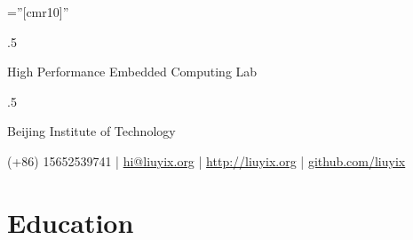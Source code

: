 \documentclass[a4paper,10pt]{article} %
\begin{document}
\pagestyle{empty} %

\font\fb=''[cmr10]'' %


\par{\bigskip\par} %

\moveleft.5\hoffset\centerline{High Performance Embedded Computing Lab} %
\moveleft.5\hoffset\centerline{Beijing Institute of Technology}
\centerline { (+86) 15652539741 | \href {mailto:hi@liuyix.org}{hi@liuyix.org} | \href {http://liuyix.org}{http://liuyix.org} | \href {https://github.com/liuyix}{github.com/liuyix} }





\section{Education}
\end{document}
